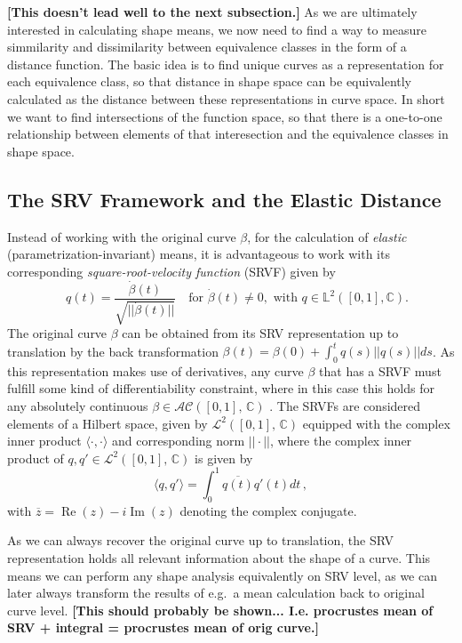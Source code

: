 \noindent \textbf{[This doesn't lead well to the next subsection.]} As we are ultimately interested in calculating shape means, we now need to find a way to measure simmilarity and dissimilarity between equivalence classes in the form of a distance function.
The basic idea is to find unique curves as a representation for each equivalence class, so that distance in shape space can be equivalently calculated as the distance between these representations in curve space.
In short we want to find intersections of the function space, so that there is a one-to-one relationship between elements of that interesection and the equivalence classes in shape space.

\subsection{The SRV Framework and the Elastic Distance}
\label{theo:srv}
Instead of working with the original curve $\beta$, for the calculation of \textit{elastic} (parametrization-invariant) means, it is advantageous to work with its corresponding \textit{square-root-velocity function} (SRVF) given by
$$ \quad q(t) = \frac{\dot{\beta}(t)}{\sqrt{|| \dot{\beta}(t) ||}} \quad \text{for} \,\, \dot{\beta}(t) \neq 0, \,\, \text{with} \,\, q \in \mathbb{L}^2([0,1], \mathbb{C}). $$
The original curve $\beta$ can be obtained from its SRV representation up to translation by the back transformation $\beta(t) = \beta(0) + \int_0^t q(s) || q(s) || ds$.
As this representation makes use of derivatives, any curve $\beta$ that has a SRVF must fulfill some kind of differentiability constraint, where in this case this holds for any absolutely continuous $\beta \in \mathcal{AC}([0,1],\, \mathbb{C})$ \parencite[see][134]{SrivastavaKlassen2016}.
The SRVFs are considered elements of a Hilbert space, given by $\mathcal{L}^2([0,1],\,\mathbb{C})$ equipped with the complex inner product $\langle \cdot, \cdot \rangle$ and corresponding norm $||\cdot||$, where the complex inner product of $q,q' \in \mathcal{L}^2([0,1],\,\mathbb{C})$ is given by
$$ \langle q, q' \rangle = \int_0^1 \overline{q(t)} q'(t) dt \,, $$
with $\overline{z} = \operatorname{Re}(z) - i \operatorname{Im}(z)$ denoting the complex conjugate.

As we can always recover the original curve up to translation, the SRV representation holds all relevant information about the shape of a curve.
This means we can perform any shape analysis equivalently on SRV level, as we can later always transform the results of e.g.\ a mean calculation back to original curve level.
\textbf{[This should probably be shown... I.e. procrustes mean of SRV + integral = procrustes mean of orig curve.]}

